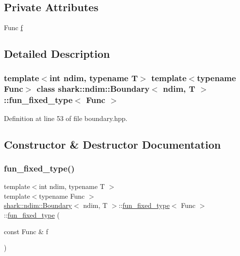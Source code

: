 \subsection*{Private Attributes}
\begin{DoxyCompactItemize}
\item 
Func \hyperlink{classshark_1_1ndim_1_1_boundary_1_1fun__fixed__type_a968985106f368116b458500c16c4476f}{f}
\end{DoxyCompactItemize}


\subsection{Detailed Description}
\subsubsection*{template$<$int ndim, typename T$>$\newline
template$<$typename Func$>$\newline
class shark\+::ndim\+::\+Boundary$<$ ndim, T $>$\+::fun\+\_\+fixed\+\_\+type$<$ Func $>$}



Definition at line 53 of file boundary.\+hpp.



\subsection{Constructor \& Destructor Documentation}
\hypertarget{classshark_1_1ndim_1_1_boundary_1_1fun__fixed__type_a90a285a78f698d32d080910c0748ecc0}{}\label{classshark_1_1ndim_1_1_boundary_1_1fun__fixed__type_a90a285a78f698d32d080910c0748ecc0} 
\subsubsection{\texorpdfstring{fun\+\_\+fixed\+\_\+type()}{fun\_fixed\_type()}}
{\footnotesize\ttfamily template$<$int ndim, typename T $>$ \\
template$<$typename Func $>$ \\
\hyperlink{classshark_1_1ndim_1_1_boundary}{shark\+::ndim\+::\+Boundary}$<$ ndim, T $>$\+::\hyperlink{classshark_1_1ndim_1_1_boundary_1_1fun__fixed__type}{fun\+\_\+fixed\+\_\+type}$<$ Func $>$\+::\hyperlink{classshark_1_1ndim_1_1_boundary_1_1fun__fixed__type}{fun\+\_\+fixed\+\_\+type} (\begin{DoxyParamCaption}\item[{const Func \&}]{f }\end{DoxyParamCaption})}



